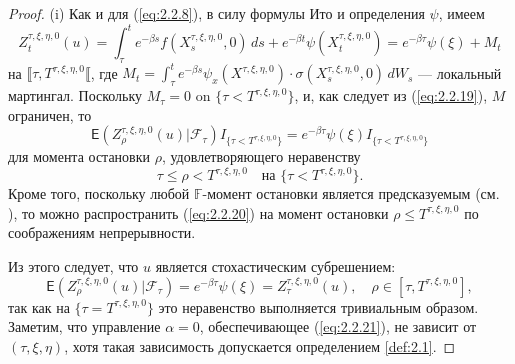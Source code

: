 \begin{proof}
(i) Как и для (\ref{eq:2.2.8}), в силу формулы Ито и определения $\psi$, имеем
\begin{equation} \label{eq:2.2.19}
Z_t^{\tau,\xi,\eta,0}(u)=\int^t_\tau e^{-\beta s} f(X_s^{\tau,\xi,\eta,0},0)\,ds+e^{-\beta t}\psi(X_t^{\tau,\xi,\eta,0})
=e^{-\beta\tau}\psi(\xi)+M_t
\end{equation}
на $\llbracket\tau,T^{\tau,\xi,\eta,0}\llbracket$, где $M_t=\int_\tau^t e^{-\beta s} \psi_x(X^{\tau,\xi,\eta,0})\cdot \sigma(X^{\tau,\xi,\eta,0}_s,0) \, dW_s$ --- локальный мартингал. Поскольку $M_\tau=0$ on $\{\tau<T^{\tau,\xi,\eta,0}\}$, и, как следует из (\ref{eq:2.2.19}), $M$ ограничен, то
$$ \mathsf E(Z_\rho^{\tau,\xi,\eta,0}(u)|\mathscr F_\tau) I_{\{\tau<T^{\tau,\xi,\eta,0}\}}=e^{-\beta\tau}\psi(\xi) I_{\{\tau<T^{\tau,\xi,\eta,0}\}}$$
для момента остановки $\rho$, удовлетворяющего неравенству
\begin{equation} \label{eq:2.2.20}
\tau\le\rho<T^{\tau,\xi,\eta,0}\quad \textrm{на }\{\tau<T^{\tau,\xi,\eta,0}\}.
\end{equation}
Кроме того, поскольку любой $\mathbb F$-момент остановки является предсказуемым (см. \cite[Proposition 16.22]{Bass11}), то можно распространить (\ref{eq:2.2.20}) на момент остановки $\rho\le T^{\tau,\xi,\eta,0}$ по соображениям непрерывности.

Из этого следует, что $u$ является стохастическим субрешением:
\begin{equation} \label{eq:2.2.21}
\mathsf E(Z_\rho^{\tau,\xi,\eta,0}(u)|\mathscr F_\tau)=e^{-\beta\tau}\psi(\xi)=Z_\tau^{\tau,\xi,\eta,0}(u),\quad
\rho\in [\tau,T^{\tau,\xi,\eta,0}],
\end{equation}
так как на $\{\tau=T^{\tau,\xi,\eta,0}\}$ это неравенство выполняется тривиальным образом. Заметим, что управление $\alpha=0$, обеспечивающее (\ref{eq:2.2.21}), не зависит от $(\tau,\xi,\eta)$, хотя такая зависимость допускается определением \ref{def:2.1}.


\end{proof}
